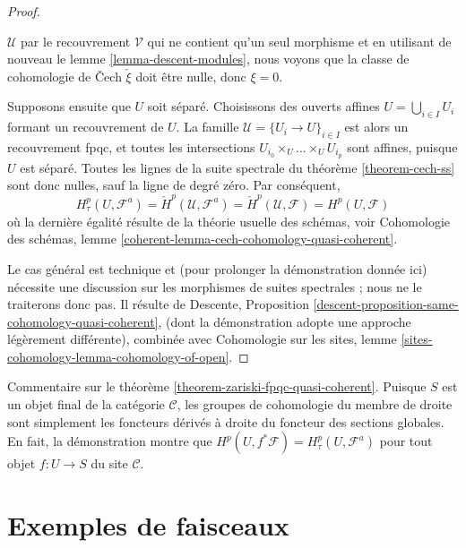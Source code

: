 \begin{proof}
\begin{enumerate}
$\mathcal{U}$ par le recouvrement $\mathcal{V}$ qui ne contient qu'un seul morphisme
et en utilisant de nouveau le lemme \ref{lemma-descent-modules},
nous voyons que la classe de cohomologie de {\v C}ech $\check \xi$ doit \^etre nulle,
donc $\xi = 0$.
\end{enumerate}
Supposons ensuite que $U$ soit s\'epar\'e. Choisissons des ouverts affines
$U = \bigcup_{i \in I} U_i$ formant un recouvrement de $U$. La famille
$\mathcal{U} = \{U_i \to U\}_{i \in I}$ est alors un recouvrement fpqc,
et toutes les intersections
$U_{i_0} \times_U \ldots \times_U U_{i_p}$ sont affines,
puisque $U$ est s\'epar\'e. Toutes les lignes de la suite spectrale du
th\'eor\`eme \ref{theorem-cech-ss}
sont donc nulles, sauf la ligne de degr\'e z\'ero. Par cons\'equent,
$$
H^p_\tau(U, \mathcal{F}^a) =
\check H^p(\mathcal{U}, \mathcal{F}^a) =
\check H^p(\mathcal{U}, \mathcal{F}) = H^p(U, \mathcal{F})
$$
o\`u la derni\`ere \'egalit\'e r\'esulte de la th\'eorie usuelle des sch\'emas, voir
Cohomologie des schémas, lemme
\ref{coherent-lemma-cech-cohomology-quasi-coherent}.

\medskip\noindent
Le cas g\'en\'eral est technique et (pour prolonger la d\'emonstration donn\'ee ici)
n\'ecessite une discussion sur les morphismes de suites spectrales ; nous ne le traiterons donc pas.
Il r\'esulte de
Descente, Proposition \ref{descent-proposition-same-cohomology-quasi-coherent},
(dont la d\'emonstration adopte une approche l\'eg\`erement diff\'erente), combin\'ee avec
Cohomologie sur les sites, lemme \ref{sites-cohomology-lemma-cohomology-of-open}.
\end{proof}

\begin{remark}
\label{remark-right-derived-global-sections}
Commentaire sur le th\'eor\`eme \ref{theorem-zariski-fpqc-quasi-coherent}.
Puisque $S$ est un objet final de la cat\'egorie $\mathcal{C}$, les groupes de cohomologie
du membre de droite sont simplement les foncteurs d\'eriv\'es \`a droite du
foncteur des sections globales. En fait, la d\'emonstration montre que
$H^p(U, f^*\mathcal{F}) = H^p_\tau(U, \mathcal{F}^a)$
pour tout objet $f : U \to S$ du site $\mathcal{C}$.
\end{remark}





\section{Exemples de faisceaux}
\label{section-examples-sheaves}

